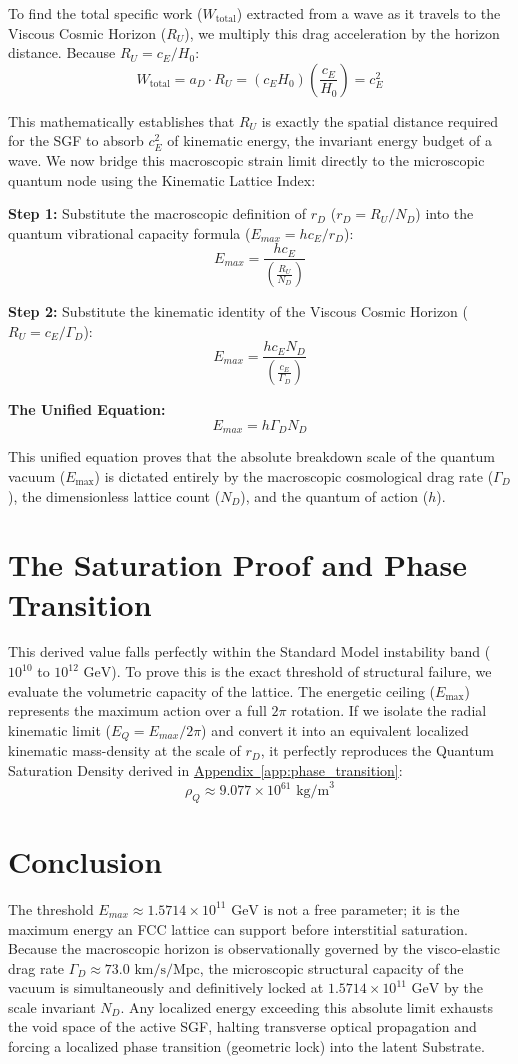 To find the total specific work ($W_{\text{total}}$) extracted from a wave as it travels to the Viscous Cosmic Horizon ($R_U$), we multiply this drag acceleration by the horizon distance. Because $R_U = c_E/H_0$:
\[
W_{\text{total}} = a_D \cdot R_U = (c_E H_0)\left(\frac{c_E}{H_0}\right) = c_E^2
\]

This mathematically establishes that $R_U$ is exactly the spatial distance required for the SGF to absorb $c_E^2$ of kinematic energy, the invariant energy budget of a wave. We now bridge this macroscopic strain limit directly to the microscopic quantum node using the Kinematic Lattice Index:

\textbf{Step 1:} Substitute the macroscopic definition of $r_D$ ($r_D = R_U / N_D$) into the quantum vibrational capacity formula ($E_{max} = hc_E/r_D$):
\[
E_{max} = \frac{hc_E}{\left( \frac{R_U}{N_D} \right)}
\]

\textbf{Step 2:} Substitute the kinematic identity of the Viscous Cosmic Horizon ($R_U = c_E / \Gamma_D$):
\[
E_{max} = \frac{hc_E N_D}{\left( \frac{c_E}{\Gamma_D} \right)}
\]

\textbf{The Unified Equation:}
\[
E_{max} = h \Gamma_D N_D
\]

This unified equation proves that the absolute breakdown scale of the quantum vacuum ($E_{\text{max}}$) is dictated entirely by the macroscopic cosmological drag rate ($\Gamma_D$), the dimensionless lattice count ($N_D$), and the quantum of action ($h$).

\section{The Saturation Proof and Phase Transition}
This derived value falls perfectly within the Standard Model instability band ($10^{10}$ to $10^{12} \text{ GeV}$). To prove this is the exact threshold of structural failure, we evaluate the volumetric capacity of the lattice. The energetic ceiling ($E_{\text{max}}$) represents the maximum action over a full $2\pi$ rotation. If we isolate the radial kinematic limit ($E_Q = E_{max}/2\pi$) and convert it into an equivalent localized kinematic mass-density at the scale of $r_D$, it perfectly reproduces the Quantum Saturation Density derived in \hyperref[app:phase_transition]{Appendix~\ref*{app:phase_transition}}:
\[
\rho_Q \approx 9.077 \times 10^{61} \text{ kg/m}^3
\]

\section{Conclusion}
The threshold $E_{max} \approx 1.5714 \times 10^{11} \text{ GeV}$ is not a free parameter; it is the maximum energy an FCC lattice can support before interstitial saturation. Because the macroscopic horizon is observationally governed by the visco-elastic drag rate $\Gamma_D \approx 73.0 \text{ km/s/Mpc}$, the microscopic structural capacity of the vacuum is simultaneously and definitively locked at $1.5714 \times 10^{11} \text{ GeV}$ by the scale invariant $N_D$. Any localized energy exceeding this absolute limit exhausts the void space of the active SGF, halting transverse optical propagation and forcing a localized phase transition (geometric lock) into the latent Substrate.
